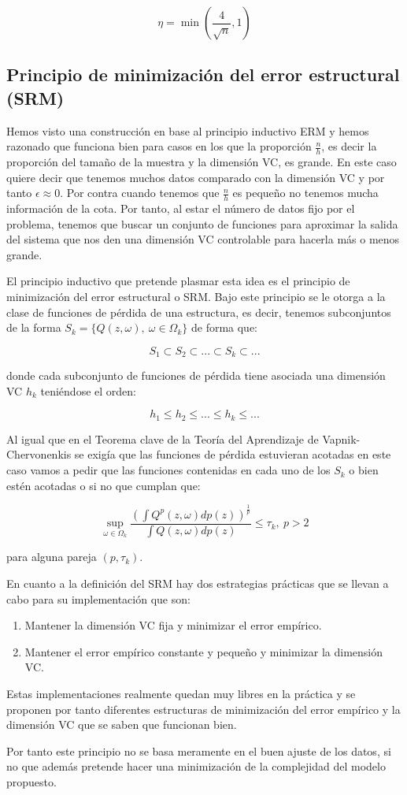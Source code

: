 $$\eta = \min (\frac{4}{\sqrt{n}},1)$$

\subsection{Principio de minimización del error estructural (SRM)}

Hemos visto una construcción en base al principio inductivo ERM y hemos razonado que funciona bien para casos en los que la proporción $\frac{n}{h}$, es decir la proporción del tamaño de la muestra y la dimensión VC, es grande. En este caso quiere decir que tenemos muchos datos comparado con la dimensión VC y por tanto $\epsilon \approx 0$. Por contra cuando tenemos que $\frac{n}{h}$ es pequeño no tenemos mucha información de la cota. Por tanto, al estar el número de datos fijo por el problema, tenemos que buscar un conjunto de funciones para aproximar la salida del sistema que nos den una dimensión VC controlable para hacerla más o menos grande.

El principio inductivo que pretende plasmar esta idea es el principio de minimización del error estructural o SRM. Bajo este principio se le otorga a la clase de funciones de pérdida de una estructura, es decir, tenemos subconjuntos de la forma $S_k = \{ Q(z,\omega), \ \omega \in \Omega_k \}$ de forma que:

$$S_1 \subset S_2 \subset ... \subset S_k \subset ...$$

donde cada subconjunto de funciones de pérdida tiene asociada una dimensión VC $h_k$ teniéndose el orden:

$$h_1 \leq h_2 \leq ... \leq h_k \leq ...$$

Al igual que en el Teorema clave de la Teoría del Aprendizaje de Vapnik-Chervonenkis se exigía que las funciones de pérdida estuvieran acotadas en este caso vamos a pedir que las funciones contenidas en cada uno de los $S_k$ o bien estén acotadas o si no que cumplan que:

$$\sup_{\omega \in \Omega_k} \frac{(\int Q^p (z,\omega)dp(z))^{\frac{1}{p}}}{\int Q(z,\omega)dp(z)}\leq \tau_k , \ p>2$$

para alguna pareja $(p,\tau_k)$.

En cuanto a la definición del SRM hay dos estrategias prácticas que se llevan a cabo para su implementación que son:

\begin{enumerate}
	\item Mantener la dimensión VC fija y minimizar el error empírico.
	\item Mantener el error empírico constante y pequeño y minimizar la dimensión VC.
\end{enumerate}

Estas implementaciones realmente quedan muy libres en la práctica y se proponen por tanto diferentes estructuras de minimización del error empírico y la dimensión VC que se saben que funcionan bien.

Por tanto este principio no se basa meramente en el buen ajuste de los datos, si no que además pretende hacer una minimización de la complejidad del modelo propuesto.